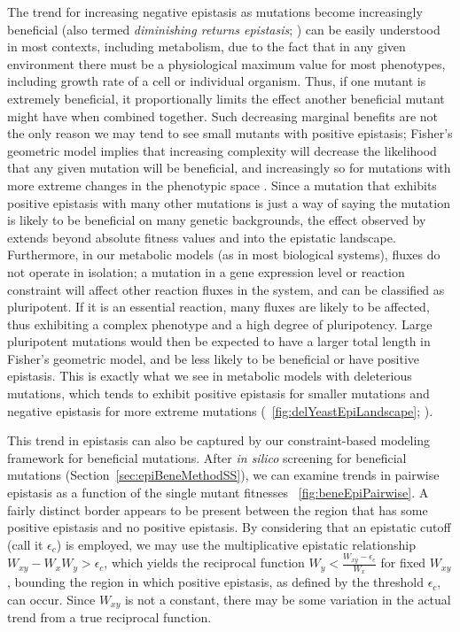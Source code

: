 The trend for increasing negative epistasis as mutations become
increasingly beneficial (also termed \textit{diminishing returns
epistasis}; \citep{Chou2011}) can be easily understood in most
contexts, including metabolism, due to the fact that in any given
environment there must be a physiological maximum value for most
phenotypes, including growth rate of a cell or individual organism.
Thus, if one mutant is extremely beneficial, it proportionally limits
the effect another beneficial mutant might have when combined
together. Such decreasing marginal benefits are not the only reason we
may tend to see small mutants with positive epistasis; Fisher's
geometric model implies that increasing complexity will decrease the
likelihood that any given mutation will be beneficial, and
increasingly so for mutations with more extreme changes in the
phenotypic space \citep{Orr2000}. Since a mutation that exhibits
positive epistasis with many other mutations is just a way of saying
the mutation is likely to be beneficial on many genetic backgrounds,
the effect observed by \citet{Orr2000} extends beyond absolute fitness
values and into the epistatic landscape. Furthermore, in our
metabolic models (as in most biological systems), fluxes do not
operate in isolation; a mutation in a gene expression level or
reaction constraint will affect other reaction fluxes in the system,
and can be classified as pluripotent. If it is an essential reaction,
many fluxes are likely to be affected, thus exhibiting a complex
phenotype and a high degree of pluripotency. Large pluripotent
mutations would then be expected to have a larger total length in
Fisher's geometric model, and be less likely to be beneficial or have
positive epistasis.  This is exactly what we see in metabolic models
with deleterious mutations, which tends to exhibit positive epistasis
for smaller mutations and negative epistasis for more extreme
mutations (\suppOrApp \Fig~\ref{fig:delYeastEpiLandscape};
\citep{He2010, Xu2012}).


This trend in epistasis can also be captured by our constraint-based
modeling framework for beneficial mutations. After \textit{in silico}
screening for beneficial mutations
(Section~\ref{sec:epiBeneMethodSS}), we can examine trends in
pairwise epistasis as a function of the single mutant fitnesses 
\Fig~\ref{fig:beneEpiPairwise}. A fairly distinct border appears
to be present between the region that has some positive epistasis and
no positive epistasis. By considering that an epistatic cutoff (call
it $\epsilon_c$) is employed, we may use the multiplicative epistatic
relationship $W_{xy} - W_x W_y > \epsilon_c$, which yields the
reciprocal function $W_y < \frac{W_{xy} - \epsilon_c}{W_x}$ for fixed
$W_{xy}$, bounding the region in which positive epistasis, as
defined by the threshold $\epsilon_c$, can occur. Since $W_{xy}$ is not a constant,
there may be some variation in the actual trend from a true reciprocal
function.

